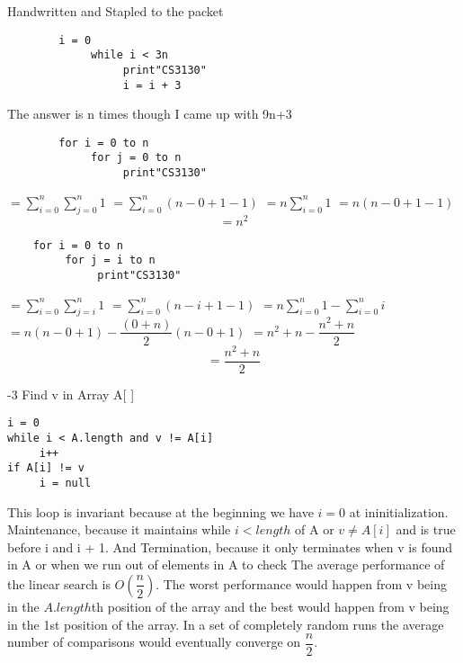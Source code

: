 \documentclass[12pt,largemargins]{homework}
\begin{document}
\question
	Handwritten and Stapled to the packet
\question
	\begin{alphaparts}
	\item
	\begin{verbatim}
		i = 0
		     while i < 3n
		          print"CS3130"
		          i = i + 3
	\end{verbatim}
		The answer is n times though I came up with 9n+3
	\item
		\begin{verbatim}
		for i = 0 to n
		     for j = 0 to n 
		          print"CS3130"
		\end{verbatim}
		$=\sum_{i=0}^{n} \sum_{j=0}^{n} 1$
		$=\sum_{i=0}^{n} (n-0+1-1)$
		$=n\sum_{i=0}^{n} 1 $
		$=n(n-0+1-1)$
		$$=n^2$$

\newpage
	\item
	\begin{verbatim}
	for i = 0 to n 
	     for j = i to n
	          print"CS3130"
	\end{verbatim}
	$=\sum_{i=0}^{n} \sum_{j=i}^{n} 1$
	$=\sum_{i=0}^{n} (n-i+1-1)$
	$=n\sum_{i=0}^{n} 1 - \sum_{i=0}^{n} i$\\
	$=n(n-0+1) - \dfrac{(0 + n)}{2} (n - 0 + 1)$
	$=n^2 + n - \dfrac{n^2 + n}{2}$ \\
	$$=\dfrac{n^2 + n}{2}$$

	\end{alphaparts}
	
-3
Find v in Array A[ ]

\begin{verbatim}
i = 0
while i < A.length and v != A[i]
     i++
if A[i] != v
     i = null
\end{verbatim}
This loop is invariant because at the beginning we have $i = 0$ at ininitialization. Maintenance, because it maintains while $i < length$ of A or $v \neq A[i]$ and is true before i and i + 1. And Termination, because it only terminates when v is found in A or when we run out of elements in A to check
\question
The average performance of the linear search is $O(\dfrac{n}{2})$. The worst performance would happen from v being in the $A.length$th position of the array and the best would happen from v being in the 1st position of the array. In a set of completely random runs the average number of comparisons would eventually converge on $\dfrac{n}{2}$.
\end{document}
